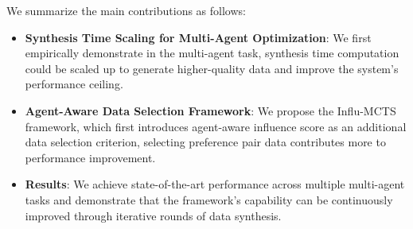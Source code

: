 We summarize the main contributions as follows: 
\begin{itemize}
    \item \textbf{Synthesis Time Scaling for Multi-Agent Optimization}: We first empirically demonstrate in the multi-agent task, synthesis time computation could be scaled up to generate higher-quality data and improve the system's performance ceiling.
    \item \textbf{Agent-Aware Data Selection Framework}: We propose the Influ-MCTS framework, which first introduces agent-aware influence score as an additional data selection criterion, selecting preference pair data contributes more to performance improvement. 
    \item \textbf{Results}: We achieve state-of-the-art performance across multiple multi-agent tasks and demonstrate that the framework's capability can be continuously improved through iterative rounds of data synthesis.
\end{itemize}